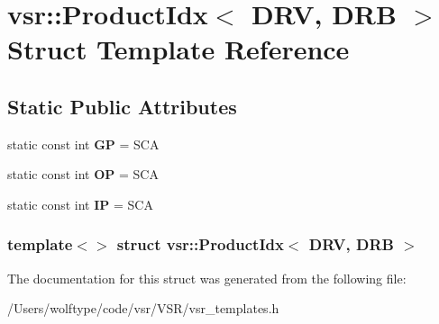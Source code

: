 \hypertarget{structvsr_1_1_product_idx_3_01_d_r_v_00_01_d_r_b_01_4}{\section{vsr\-:\-:Product\-Idx$<$ D\-R\-V, D\-R\-B $>$ Struct Template Reference}
\label{structvsr_1_1_product_idx_3_01_d_r_v_00_01_d_r_b_01_4}
}
\subsection*{Static Public Attributes}
\begin{DoxyCompactItemize}
\item 
\hypertarget{structvsr_1_1_product_idx_3_01_d_r_v_00_01_d_r_b_01_4_a921d8c24437ce3599426719781fcc13d}{static const int {\bfseries G\-P} = S\-C\-A}\label{structvsr_1_1_product_idx_3_01_d_r_v_00_01_d_r_b_01_4_a921d8c24437ce3599426719781fcc13d}

\item 
\hypertarget{structvsr_1_1_product_idx_3_01_d_r_v_00_01_d_r_b_01_4_ade1ff852c717c8c1273494fb3e1cd27d}{static const int {\bfseries O\-P} = S\-C\-A}\label{structvsr_1_1_product_idx_3_01_d_r_v_00_01_d_r_b_01_4_ade1ff852c717c8c1273494fb3e1cd27d}

\item 
\hypertarget{structvsr_1_1_product_idx_3_01_d_r_v_00_01_d_r_b_01_4_a3e1dc5c07db7309aa192ef34ecc3591f}{static const int {\bfseries I\-P} = S\-C\-A}\label{structvsr_1_1_product_idx_3_01_d_r_v_00_01_d_r_b_01_4_a3e1dc5c07db7309aa192ef34ecc3591f}

\end{DoxyCompactItemize}
\subsubsection*{template$<$$>$ struct vsr\-::\-Product\-Idx$<$ D\-R\-V, D\-R\-B $>$}



The documentation for this struct was generated from the following file\-:\begin{DoxyCompactItemize}
\item 
/\-Users/wolftype/code/vsr/\-V\-S\-R/vsr\-\_\-templates.\-h\end{DoxyCompactItemize}
